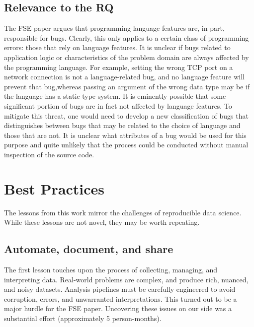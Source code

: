 \documentclass[acmsmall]{acmart}
\begin{document}
\subsection{Relevance to the RQ} 
The FSE paper argues that programming language features are, in part,
responsible for bugs. Clearly, this only applies to a certain class of
programming errors: those that rely on language features.  It is unclear if
bugs related to application logic or characteristics of the problem domain
are always affected by the programming language. For example, setting the
wrong TCP port on a network connection is not a language-related bug, and no
language feature will prevent that bug,whereas passing an argument of the
wrong data type may be if the language has a static type system. It is
eminently possible that some significant portion of bugs are in fact not
affected by language features. To mitigate this threat, one would need to
develop a new classification of bugs that distinguishes between bugs that
may be related to the choice of language and those that are not. It is
unclear what attributes of a bug would be used for this purpose and quite
unlikely that the process could be conducted without manual inspection of
the source code.


\section{Best Practices}\label{best}

The lessons from this work mirror the challenges of reproducible data science.
While these lessons are not novel, they may be worth repeating.  


\subsection{Automate, document, and share} 
The first lesson touches upon the process of collecting, managing, and
interpreting data.  Real-world problems are complex, and produce rich,
nuanced, and noisy datasets. Analysis pipelines must be carefully engineered
to avoid corruption, errors, and unwarranted interpretations. This turned
out to be a major hurdle for the FSE paper. Uncovering these issues on our
side was a substantial effort (approximately 5 person-months). 
\end{document}
